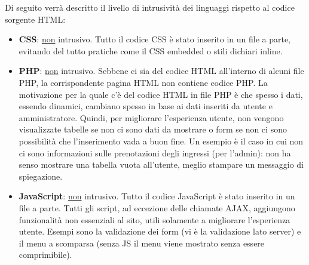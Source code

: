 Di seguito verrà descritto il livello di intrusività dei linguaggi rispetto al codice sorgente HTML:
\begin{itemize}
    \item \textbf{CSS}: \underline{non} intrusivo. Tutto il codice CSS è stato inserito in un file a parte, evitando del tutto pratiche come il CSS embedded o stili dichiari inline.
    
    \item \textbf{PHP}: \underline{non} intrusivo. Sebbene ci sia del codice HTML all'interno di alcuni file PHP, la corrispondente pagina HTML non contiene codice PHP. La motivazione per la quale c'è del codice HTML in file PHP è che spesso i dati, essendo dinamici, cambiano spesso in base ai dati inseriti da utente e amministratore. Quindi, per migliorare l'esperienza utente, non vengono visualizzate tabelle se non ci sono dati da mostrare o form se non ci sono possibilità che l'inserimento vada a buon fine. Un esempio è il caso in cui non ci sono informazioni sulle prenotazioni degli ingressi (per l'admin): non ha senso mostrare una tabella vuota all'utente, meglio stampare un messaggio di spiegazione. 
    
    \item \textbf{JavaScript}: \underline{non} intrusivo. Tutto il codice JavaScript è stato inserito in un file a parte. Tutti gli script, ad eccezione delle chiamate AJAX, aggiungono funzionalità non essenziali al sito, utili solamente a migliorare l'esperienza utente. Esempi sono la validazione dei form (vi è la validazione lato server) e il menu a scomparsa (senza JS il menu viene mostrato senza essere comprimibile).
\end{itemize}